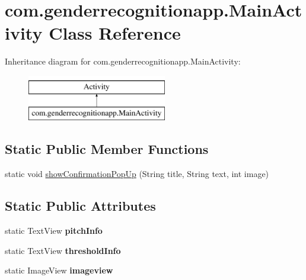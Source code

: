 \hypertarget{classcom_1_1genderrecognitionapp_1_1_main_activity}{}\section{com.\+genderrecognitionapp.\+Main\+Activity Class Reference}
\label{classcom_1_1genderrecognitionapp_1_1_main_activity}
Inheritance diagram for com.\+genderrecognitionapp.\+Main\+Activity\+:\begin{figure}[H]
\begin{center}
\leavevmode
\includegraphics[height=2.000000cm]{classcom_1_1genderrecognitionapp_1_1_main_activity}
\end{center}
\end{figure}
\subsection*{Static Public Member Functions}
\begin{DoxyCompactItemize}
\item 
static void \hyperlink{classcom_1_1genderrecognitionapp_1_1_main_activity_ad6fe22aaba9d78c5bbfa4d61ae5aa6bd}{show\+Confirmation\+Pop\+Up} (String title, String text, int image)
\end{DoxyCompactItemize}
\subsection*{Static Public Attributes}
\begin{DoxyCompactItemize}
\item 
\hypertarget{classcom_1_1genderrecognitionapp_1_1_main_activity_a866fd5ba60bdb60bae99124ee88ada56}{}static Text\+View {\bfseries pitch\+Info}\label{classcom_1_1genderrecognitionapp_1_1_main_activity_a866fd5ba60bdb60bae99124ee88ada56}

\item 
\hypertarget{classcom_1_1genderrecognitionapp_1_1_main_activity_acc0c4c5ea9c43f38c0dbf17bd205083d}{}static Text\+View {\bfseries threshold\+Info}\label{classcom_1_1genderrecognitionapp_1_1_main_activity_acc0c4c5ea9c43f38c0dbf17bd205083d}

\item 
\hypertarget{classcom_1_1genderrecognitionapp_1_1_main_activity_a60bd4a7bf2a8b139097ce4ee8b151ea3}{}static Image\+View {\bfseries imageview}\label{classcom_1_1genderrecognitionapp_1_1_main_activity_a60bd4a7bf2a8b139097ce4ee8b151ea3}

\end{DoxyCompactItemize}
